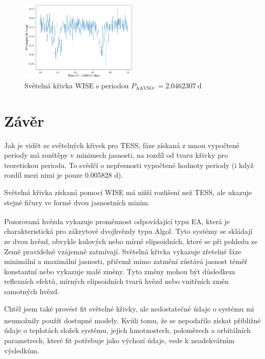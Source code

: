\documentclass[a4paper,11pt,twocolumn]{article}
\begin{document}
        \begin{figure}
            \centering
            \includegraphics[width=0.5\textwidth]{wise_lc.png}
            \caption{Světelná křivka WISE s periodou $P_{\text{AAVSO}}. = 2.0462307 ~\text{d}$}
            \label{fig:wise_lc}
        \end{figure}

    \section{Závěr}
        Jak je vidět ze světelných křivek pro TESS, fáze získaná z mnou vypočtené periody má rozštěpy v minimech jasnosti, na rozdíl od tvaru křivky pro teoretickou periodu. To svědčí o nepřesnosti vypočtené hodnoty periody (i když rozdíl mezi nimi je pouze 0.005828 d).

        Světelná křivka získaná pomocí WISE má nižší rozlišení než TESS, ale ukazuje stejné fičury ve formě dvou jasnostních minim. 

        Pozorovaná hvězda vykazuje proměnnost odpovídající typu EA\textsuperscript{\cite{vsx}}, která je charakteristická pro zákrytové dvojhvězdy typu Algol. Tyto systémy se skládají ze dvou hvězd, obvykle kulových nebo mírně elipsoidních, které se při pohledu ze Země pravidelně vzájemně zatmívají. Světelná křivka vykazuje zřetelné fáze minimální a maximální jasnosti, přičemž mimo zatmění zůstává jasnost téměř konstantní nebo vykazuje malé změny. Tyto změny mohou být důsledkem reflexních efektů, mírných elipsoidních tvarů hvězd nebo vnitřních změn samotných hvězd. 

        Chtěl jsem také provést fit světelné křivky, ale nedostatečné údaje o systému mi neumožnily použít dostupné modely\textsuperscript{\cite{elisa}}\textsuperscript{\cite{eb}}. Kvůli tomu, že se nepodařilo získat přibližné údaje o teplotách složek systému, jejich hmotnostech, poloměrech a orbitálních parametrech, které fit potřebuje jako výchozí údaje, vede k neadekvátním výsledkům. 

    
    \nocite{*}
    
\end{document}
